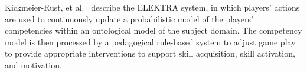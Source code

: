 \documentclass{sig-alternate-05-2015}
\begin{document}
Kickmeier-Rust, et al.~\cite{kickmeier2008micro} describe the ELEKTRA system, in which players' actions are used to continuously update a probabilistic model of the players' competencies within an ontological model of the subject domain. The competency model is then processed by a pedagogical rule-based system to adjust game play to provide appropriate interventions to support skill acquisition, skill activation, and motivation.
\end{document}

